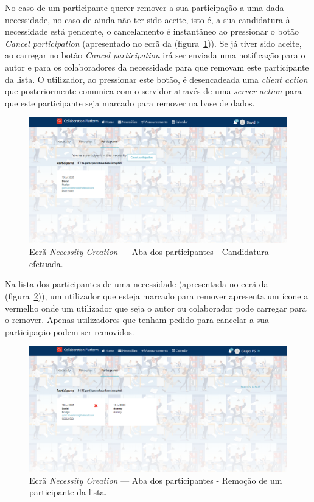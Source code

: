 No caso de um participante querer remover a sua participação a uma dada necessidade, no caso de ainda não ter sido aceite, isto é, a sua candidatura à necessidade está pendente, o cancelamento é instantâneo ao pressionar o botão \textit{Cancel participation} (apresentado no ecrã da (figura~\ref{fig:participants_removal})).
Se já tiver sido aceite, ao carregar no botão \textit{Cancel participation} irá ser enviada uma notificação para o autor e para os colaboradores da necessidade para que removam este participante da lista. 
O utilizador, ao pressionar este botão, é desencadeada uma \textit{client action} que posteriormente comunica com o servidor através de uma \textit{server action} para que este participante seja marcado para remover na base de dados.

\begin{figure}[H]
  \centering 
  \includegraphics[scale=0.4]{figures/Participants_removal.png}
  \caption{Ecrã \textit{Necessity Creation} --- Aba dos participantes - Candidatura efetuada.}\label{fig:participants_removal}
\end{figure}


Na lista dos participantes de uma necessidade (apresentada no ecrã da (figura~\ref{fig:participants_removal2})), um utilizador que esteja marcado para remover apresenta um ícone a vermelho onde um utilizador que seja o autor ou colaborador pode carregar para o remover. 
Apenas utilizadores que tenham pedido para cancelar a sua participação podem ser removidos.

\begin{figure}[H]
  \centering 
  \includegraphics[scale=0.4]{figures/Participants_removal2.png}
  \caption{Ecrã \textit{Necessity Creation} --- Aba dos participantes - Remoção de um participante da lista.}\label{fig:participants_removal2}
\end{figure}




